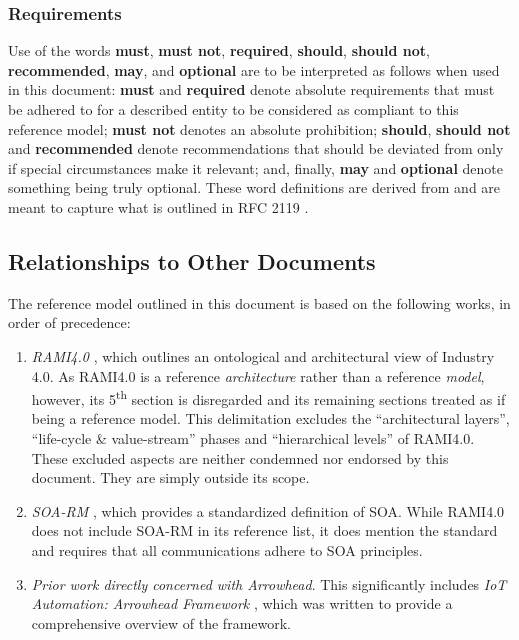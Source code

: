 \subsubsection{Requirements}

Use of the words \textbf{must}, \textbf{must not}, \textbf{required}, \textbf{should}, \textbf{should not}, \textbf{recommended}, \textbf{may}, and \textbf{optional} are to be interpreted as follows when used in this document: \textbf{must} and \textbf{required} denote absolute requirements that must be adhered to for a described entity to be considered as compliant to this reference model; \textbf{must not} denotes an absolute prohibition; \textbf{should}, \textbf{should not} and \textbf{recommended} denote recommendations that should be deviated from only if special circumstances make it relevant; and, finally, \textbf{may} and \textbf{optional} denote something being truly optional.
These word definitions are derived from and are meant to capture what is outlined in RFC 2119 \cite{bradner1997keywords}.

\subsection{Relationships to Other Documents}
\label{sec:introduction:relationships}

The reference model outlined in this document is based on the following works, in order of precedence:

\begin{enumerate}
\item \textit{RAMI4.0} \cite{adolphs2016reference}, which outlines an ontological and architectural view of Industry 4.0.
As RAMI4.0 is a reference \textit{architecture} rather than a reference \textit{model}, however, its 5\textsuperscript{th} section is disregarded and its remaining sections treated as if being a reference model.
This delimitation excludes the ``architectural layers'', ``life-cycle \& value-stream'' phases and ``hierarchical levels'' of RAMI4.0.
These excluded aspects are neither condemned nor endorsed by this document.
They are simply outside its scope. 

\item \textit{SOA-RM} \cite{mackenzie2006reference}, which provides a standardized definition of SOA.
While RAMI4.0 does not include SOA-RM in its reference list, it does mention the standard and requires that all communications adhere to SOA principles. 

\item \textit{Prior work directly concerned with Arrowhead}.
This significantly includes \textit{IoT Automation: Arrowhead Framework} \cite{delsing2017iot}, which was written to provide a comprehensive overview of the framework.

\end{enumerate}

